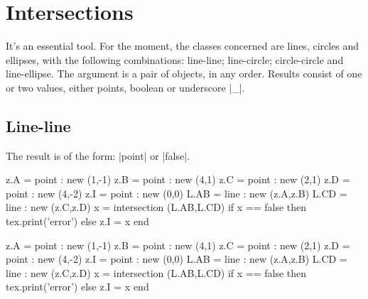 \newpage
\section{Intersections} %
\label{sec:intersections}

It's an essential tool. For the moment, the classes concerned are lines, circles and ellipses, with the following combinations: line-line; line-circle; circle-circle and line-ellipse. The argument is a pair of objects, in any order.
Results consist of one or two values, either points, boolean  or underscore |_|. 

\subsection{Line-line} %
\label{sub:line_line}

The result is of the form: |point| or |false|.

\begin{minipage}{0.6\textwidth}
\begin{tkzexample}
\begin{tkzelements}
   z.A   = point : new (1,-1)
   z.B   = point : new (4,1)
   z.C   = point : new (2,1)
   z.D   = point : new (4,-2) 
    z.I  = point : new (0,0)
   L.AB  = line : new (z.A,z.B)
   L.CD  = line : new (z.C,z.D)
   x     = intersection (L.AB,L.CD)
   if x  == false then 
   tex.print('error')
   else 
   z.I   = x
   end
\end{tkzelements}

\end{tkzexample}
\end{minipage}
\begin{minipage}{0.4\textwidth}
\begin{tkzelements}
z.A   = point : new (1,-1)
z.B   = point : new (4,1)
z.C   = point : new (2,1)
z.D   = point : new (4,-2) 
 z.I  = point : new (0,0)
L.AB  = line : new (z.A,z.B)
L.CD  = line : new (z.C,z.D)
x = intersection (L.AB,L.CD)
if x  == false then 
tex.print('error')
else 
z.I   = x
end
\end{tkzelements}

\end{minipage}

